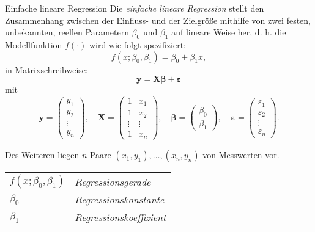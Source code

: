 \begin{defi}{Einfache lineare Regression}
    Die \emph{einfache lineare Regression} stellt den Zusammenhang zwischen der Einfluss- und der Zielgröße mithilfe von zwei festen, unbekannten, reellen Parametern $\beta_{0}$ und $\beta_{1}$ auf lineare Weise her, d. h. die Modellfunktion $f(\cdot)$ wird wie folgt spezifiziert:
    \[
        f(x; \beta_0, \beta_1) = \beta_0 + \beta_1 x,
    \]
    in Matrixschreibweise:
    \[
        \mathbf{y} = \mathbf{X} \boldsymbol{\beta} + \boldsymbol{\varepsilon}
    \]
    mit
    \[
        \mathbf{y} = \begin{pmatrix}
            y_1 \\ y_2 \\ \vdots \\ y_n
        \end{pmatrix},
        \quad \mathbf{X} = \begin{pmatrix}
            1 & x_1 \\ 1 & x_2 \\ \vdots & \vdots \\ 1 & x_n
        \end{pmatrix},
        \quad \boldsymbol{\beta} = \begin{pmatrix}
            \beta_0 \\ \beta_1
        \end{pmatrix},
        \quad \boldsymbol{\varepsilon} = \begin{pmatrix}
            \varepsilon_1 \\ \varepsilon_2 \\ \vdots \\ \varepsilon_n
        \end{pmatrix}.
    \]

    Des Weiteren liegen $n$ Paare $(x_{1}, y_{1}),\ldots ,(x_{n},y_{n})$ von Messwerten vor.

    \tcbline

    \begin{tabularx}{\linewidth}{lX}
        $f(x; \beta_0, \beta_1)$ & \emph{Regressionsgerade}      \\
        $\beta_0$                & \emph{Regressionskonstante}   \\
        $\beta_1$                & \emph{Regressionskoeffizient}
    \end{tabularx}
\end{defi}

